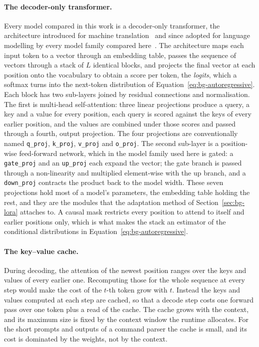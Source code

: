\paragraph{The decoder-only transformer.} Every model compared in this work is a decoder-only
transformer, the architecture introduced for machine translation~\cite{vaswani2017} and since
adopted for language modelling by every model family compared here~\cite{qwen25,smollm2,llama32card,danube3}.
The architecture maps each input token to a vector through an embedding table, passes the
sequence of vectors through a stack of $L$ identical blocks, and projects the final vector at
each position onto the vocabulary to obtain a score per token, the \emph{logits}, which a softmax
turns into the next-token distribution of Equation~\ref{eq:bg-autoregressive}.
Each block has two sub-layers joined by residual connections and normalisation. The first is
multi-head self-attention: three linear projections produce a query, a key and a value for every
position, each query is scored against the keys of every earlier position, and the values are
combined under those scores and passed through a fourth, output projection. The four
projections are conventionally named \texttt{q\_proj}, \texttt{k\_proj}, \texttt{v\_proj} and
\texttt{o\_proj}. The second sub-layer is a position-wise feed-forward network, which in the
model family used here is gated: a \texttt{gate\_proj} and an \texttt{up\_proj} each expand the
vector; the gate branch is passed through a non-linearity and multiplied element-wise with the up
branch, and a \texttt{down\_proj} contracts the product back to the model width. These seven
projections hold most of a model's parameters, the embedding table holding the rest, and they are
the modules that the adaptation method of Section~\ref{sec:bg-lora} attaches to. A
causal mask restricts every position to attend to itself and earlier positions only, which is
what makes the stack an estimator of the conditional distributions in
Equation~\ref{eq:bg-autoregressive}.

\paragraph{The key--value cache.} During decoding, the attention of the newest position ranges
over the keys and values of every earlier one. Recomputing those for the whole sequence at every
step would make the cost of the $t$-th token grow with $t$. Instead the keys and values computed
at each step are cached, so that a decode step costs one forward pass over one token plus a read
of the cache. The cache grows with the context, and its maximum size is fixed by the context
window the runtime allocates. For the short prompts and outputs of a command parser the cache is
small, and its cost is dominated by the weights, not by the context.

